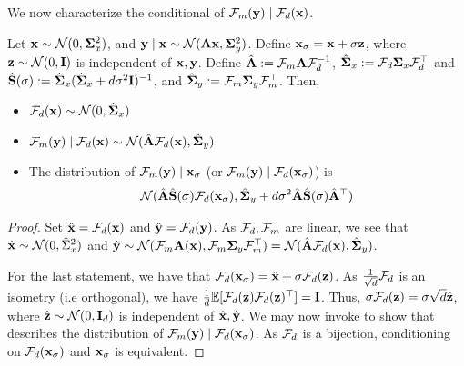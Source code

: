 We now characterize the conditional of $\Four[m](\by) \mid \Four(\bx)$.

\begin{proposition}\label{lem:fourier_eiv} Let $\bx \sim \cN(0,\bSigma_x^2)$,  and $\by \mid \bx \sim \cN(\bA \bx, \bSigma_y^2)$. Define $\bx_{\sigma} = \bx + \sigma \bz$, where $\bz \sim \cN(0,\eye)$ is independent of $\bx,\by$.   Define $\hat \bA := \Four[m] \bA \Four^{-1}$, $\hat \bSigma_x := \Four \bSigma_x \Four^\top$ and $\hat \bS(\sigma) := \hat \bSigma_x ( \hat \bSigma_x + d\sigma^2  \eye)^{-1}$, and $\hat \bSigma_y := \Four[m] \bSigma_y \Four[m]^\top$. 
Then, 
\begin{itemize}
    \item $\Four(\bx) \sim \cN(0, \hat \bSigma_x)$
    \item $\Four[m](\by) \mid \Four(\bx) \sim \cN(\hat \bA \Four(\bx), \hat \bSigma_y)$
    \item The distribution of $\Four[m](\by) \mid \bx_{\sigma} $ (or $\Four[m](\by) \mid \Four(\bx_{\sigma}) $)  is
    \begin{align}
\cN( \hat \bA \hat \bS(\sigma)  \Four(\bx_{\sigma}), \hat \bSigma_y + d \sigma^2 \hat \bA \hat \bS(\sigma)\hat\bA^\top ) \label{eq:conditional_fourier}
\end{align}
\end{itemize}

    
\end{proposition}
\begin{proof} Set $\hat \bx = \Four(\bx)$ and $\hat \by = \Four(\by)$. As $\Four,\Four[m]$ are linear, we see that $\hat \bx \sim \cN(0,\hat \Sigma_x^2)$ and $\hat \by \sim \cN(\Four[m]\bA(\bx), \Four[m]\bSigma_y \Four[m]^\top) = \cN(\hat \bA \Four(\bx), \hat \bSigma_y)$. 

For the last statement, we have that $\Four(\bx_\sigma) = \hat \bx + \sigma \Four(\bz)$. As $\frac{1}{\sqrt{d}}\Four$ is an isometry (i.e orthogonal), we have $\frac{1}{d}\Exp[\Four(\bz)\Four(\bz)^\top] = \eye$. Thus, $\sigma \Four(\bz) = \sigma \sqrt{d} \hat \bz$, where $\hat \bz \sim \cN(0,\eye_d)$ is independent of $\hat \bx, \hat \by$. We may now invoke  to show that   describes the distribution of $\Four[m](\by) \mid \Four(\bx_{\sigma})$. As $\Four$ is a bijection, conditioning on $\Four(\bx_{\sigma})$ and $\bx_{\sigma}$ is equivalent.
\end{proof}

